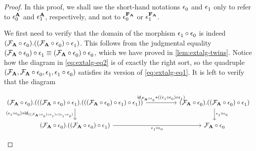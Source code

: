 \begin{proof}
In this proof, we shall use the short-hand notations $\cftctxext$ and $\cftfamext$
only to refer to $\cftctxext[\cftalg{A}]$ and $\cftfamext[\cftalg{A}]$, respectively,
and not to $\cftctxext[\cftfamalg{\cftalg{A}}]$ or 
$\cftfamext[\cftfamalg{\cftalg{A}}]$.

We first need to verify that the domain of the morphism 
$\jcomp{}{\cftctxext}{\cftfamext}$ is indeed
$\ctxext{\jcomp{}{\cftctxext}{\cftalgf{\cftalg{A}}}}{\jcomp{}{\cftfamext}{{}{\cftctxext}{\cftalgf{\cftalg{A}}}}}$. 
This follows from the judgmental equality
$\jcomp{}{\cftfamext}{{}{\cftctxext}{\cftalgf{\cftalg{A}}}}\jdeq
\jcomp{}{\cftctxext}{{}{\cftctxext}{\cftalgf{\cftalg{A}}}}$, which we have proved in
\autoref{lem:extalg-twins}. Notice how the diagram in \autoref{eq:extalg-eq2} is
of exactly the right sort, so the quadruple
$(\cftalgf{\cftalg{A}},\jcomp{}{\cftctxext}{\cftalgf{\cftalg{A}}},\cftfamext,\jcomp{}{\cftctxext}{\cftfamext})$
satisfies its version of \autoref{eq:extalg-eq1}. It is left to verify that the diagram
\begin{small}
\begin{equation*}
\begin{tikzcd}[column sep=huge]
\ctxext
  { \jcomp{}{\cftctxext}{\cftalgf{\cftalg{A}}}
    }
  { { \jcomp{}{\cftfamext}{%
        \jcomp{}{\cftctxext}{\cftalgf{\cftalg{A}}}
        }
      }
    { \jcomp{}{\cftfamext}{%
        \jcomp{}{\cftfamext}{%
          \jcomp{}{\cftctxext}{\cftalgf{\cftalg{A}}}
          }
        }
      }
    } 
  \ar{r}
    { \jvcomp{}{\idtm{\jcomp{}{\cftctxext}{\cftalgf{\cftalg{A}}}}}{%
        \jcomp{}{\cftfamext}{%
          \jcomp{}{\cftctxext}{\cftfamext}}}}
  \ar{d}[swap]{
    \jvcomp{}{\jcomp{}{\cftctxext}{\cftfamext}}{%
      \idtm{
        \jcomp{}{\jcomp{}{\cftctxext}{\cftfamext}}{%
          \jcomp{}{\cftfamext}{%
            \jcomp{}{\cftctxext}{\cftalgf{\cftalg{A}}}
            }
          }
        }
      }
    }
& \ctxext
    {\jcomp{}{\cftctxext}{\cftalgf{\cftalg{A}}}}
    {\jcomp{}{\cftfamext}{\jcomp{}{\cftctxext}{\cftalgf{\cftalg{A}}}}} 
  \ar{d}{\jcomp{}{\cftctxext}{\cftfamext}}
  \\
\ctxext
  {\jcomp{}{\cftctxext}{\cftalgf{\cftalg{A}}}}
  {\jcomp{}{\cftfamext}{\jcomp{}{\cftctxext}{\cftalgf{\cftalg{A}}}}} 
  \ar{r}[swap]{\jcomp{}{\cftctxext}{\cftfamext}} 
& \jcomp{}{\cftctxext}{\cftalgf{\cftalg{A}}}
\end{tikzcd}
\end{equation*}
\end{small}%

\end{proof}
